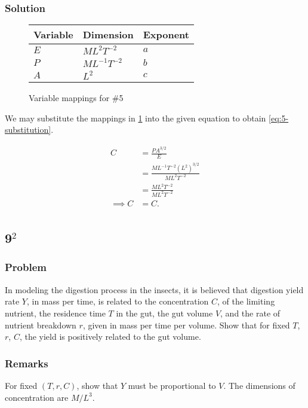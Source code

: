 \documentclass[12pt]{article}
\begin{document}
  \subsubsection*{Solution}
  \begin{figure}
    \centering
    \begin{tabularx}{0.5\textwidth}{XXX}
      Variable & Dimension & Exponent \\ \hline
      $E$ & $ML^2T^{-2}$ & $a$ \\
      $P$ & $ML^{-1}T^{-2}$ & $b$ \\
      $A$ & $L^2$ & $c$ \\
    \end{tabularx}
    \caption{Variable mappings for \#5}
    \label{fig:5-var-mappings}
  \end{figure}

  We may substitute the mappings in \cref{fig:5-var-mappings} into the given
  equation to obtain \cref{eq:5-substitution}.

  \begin{equation}
    \label{eq:5-substitution}
    \boxed{
    \begin{aligned}
      C &= \frac{PA^{3/2}}{E} \\
        &= \frac{ML^{-1}T^{-2}(L^2)^{3/2}}{ML^2T^{-2}} \\
        &= \frac{ML^2T^{-2}}{ML^2T^{-2}} \\
      \implies C &= C. \\
    \end{aligned}
    }
  \end{equation}

  \newpage
\subsection{9$^2$}
  \subsubsection*{Problem}
  In modeling the digestion process in the insects, it is believed that
  digestion yield rate $Y$, in mass per time, is related to the concentration
  $C$, of the limiting nutrient, the residence time $T$ in the gut, the gut
  volume $V$, and the rate of nutrient breakdown $r$, given in mass per time per
  volume. Show that for fixed $T$, $r$, $C$, the yield is positively related to
  the gut volume.

  \subsubsection*{Remarks}
  For fixed $(T,r,C)$, show that $Y$ must be proportional to
  $V$. The dimensions of concentration are $M/L^3$.
\end{document}
